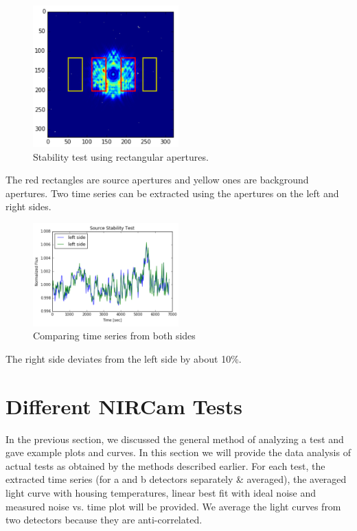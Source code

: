 \documentclass{aastex6}
\begin{document}
\begin{figure}[H]
    \begin{centering}
    \includegraphics[width=0.5\textwidth]{stability1}
    \caption{Stability test using rectangular apertures.}
    \end{centering}
\end{figure}

The red rectangles are source apertures and yellow ones are background apertures. Two time series can be extracted using the apertures on the left and right sides.\\

\begin{figure}[H]
    \begin{centering}
    \includegraphics[width=0.5\textwidth]{stability2}
    \caption{Comparing time series from both sides}
    \end{centering}
\end{figure}

The right side deviates from the left side by about 10\%. 



\section{Different NIRCam Tests}
In the previous section, we discussed the general method of analyzing a test and gave example plots and curves. In this section we will provide the data analysis of actual tests as obtained by the methods described earlier. For each test, the extracted time series (for a and b detectors separately \& averaged), the averaged light curve with housing temperatures, linear best fit with ideal noise and measured noise vs. time plot will be provided. We average the light curves from two detectors because they are anti-correlated. 
\end{document}

